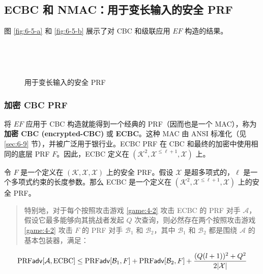 \subsection{ECBC 和 NMAC：用于变长输入的安全 PRF}

图 \ref{fig:6-5-a} 和 \ref{fig:6-5-b} 展示了对 CBC 和级联应用 $EF$ 构造的结果。

\begin{figure}
  \centering
  
  \,
  
  \,
  
  \caption{用于变长输入的安全 PRF}
\end{figure}

\subsubsection{加密 CBC PRF}

将 $EF$ 应用于 CBC 构造就能得到一个经典的 PRF（因而也是一个 MAC），称为\textbf{加密 CBC (encrypted-CBC)} 或 \textbf{ECBC}。这种 MAC 由 ANSI 标准化（见 \ref{sec:6-9} 节），并被广泛用于银行业。ECBC PRF 在 CBC 和最终的加密中使用相同的底层 PRF $F$。因此，ECBC 定义在 $(\mathcal{K}^2,\mathcal{X}^{\leq\ell+1},\mathcal{X})$ 上。

\begin{theorem}\label{theo:6-6}
令 $F$ 是一个定义在 $(\mathcal{K},\mathcal{X},\mathcal{X})$ 上的安全 PRF。假设 $\mathcal{X}$ 是超多项式的，$\ell$ 是一个多项式约束的长度参数。那么 ECBC 是一个定义在 $(\mathcal{K}^2,\mathcal{X}^{\leq\ell+1},\mathcal{X})$ 上的安全 PRF。
\begin{quote}
特别地，对于每个按照攻击游戏 \ref{game:4-2} 攻击 ECBC 的 PRF 对手 $\mathcal{A}$，假设它最多能够向其挑战者发起 $Q$ 次查询，则必然存在两个按照攻击游戏 \ref{game:4-2} 攻击 $F$ 的 PRF 对手 $\mathcal{B}_1$ 和 $\mathcal{B}_2$，其中 $\mathcal{B}_1$ 和 $\mathcal{B}_2$ 都是围绕 $\mathcal{A}$ 的基本包装器，满足：
\end{quote}
\begin{equation}\label{eq:6-19}
{\rm PRF}\mathsf{adv}[\mathcal{A},{\rm ECBC}]\leq{\rm PRF}\mathsf{adv}[\mathcal{B}_1,F]+{\rm PRF}\mathsf{adv}[\mathcal{B}_2,F]+\frac{(Q(l+1))^2+Q^2}{2|\mathcal{X}|}
\end{equation}
\end{theorem}


